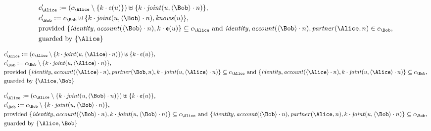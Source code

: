 \begin{align*}
&
c'_
{
\Alice
}
 := 
(c_
{
\Alice
}
 \setminus 
\{
k
\cdot
\text{\textcent}
(
u
)
\}
) \uplus 
\{
k
\cdot
\mathit{
joint
}
(
u
,
\langle
\Bob
\rangle
\cdot
n
)
\}
,\\
&
c'_
{
\Bob
}
 := 
c_
{
\Bob
}
 \uplus 
\{
k
\cdot
\mathit{
joint
}
(
u
,
\langle
\Bob
\rangle
\cdot
n
)
,
\mathit{
knows
}
(
u
)
\}
,\\
&
\text{provided } 
\{
\mathit{
identity
}
,
\mathit{
account
}
(
\langle
\Bob
\rangle
\cdot
n
)
,
k
\cdot
\text{\textcent}
(
u
)
\}
 \subseteq c_
{
\Alice
}
 \text{ and } 
\mathit{
identity
}
,
\mathit{
account
}
(
\langle
\Bob
\rangle
\cdot
n
)
,
\mathit{
partner
}
(
\Alice
,
n
)
 \in c_
{
\Bob
}
,\\
&
\text{guarded by } \{
\Alice
\}
\end{align*}

\begin{align*}
&
c'_
{
\Alice
}
 := 
(c_
{
\Alice
}
 \setminus 
\{
k
\cdot
\mathit{
joint
}
(
u
,
\langle
\Alice
\rangle
\cdot
n
)
\}
) \uplus 
\{
k
\cdot
\text{\textcent}
(
u
)
\}
,\\
&
c'_
{
\Bob
}
 := 
c_
{
\Bob
}
 \setminus 
\{
k
\cdot
\mathit{
joint
}
(
u
,
\langle
\Alice
\rangle
\cdot
n
)
\}
,\\
&
\text{provided } 
\{
\mathit{
identity
}
,
\mathit{
account
}
(
\langle
\Alice
\rangle
\cdot
n
)
,
\mathit{
partner
}
(
\Bob
,
n
)
,
k
\cdot
\mathit{
joint
}
(
u
,
\langle
\Alice
\rangle
\cdot
n
)
\}
 \subseteq c_
{
\Alice
}
 \text{ and } 
\{
\mathit{
identity
}
,
\mathit{
account
}
(
\langle
\Alice
\rangle
\cdot
n
)
,
k
\cdot
\mathit{
joint
}
(
u
,
\langle
\Alice
\rangle
\cdot
n
)
\}
 \subseteq c_
{
\Bob
}
,\\
&
\text{guarded by } \{
\Alice
,
\Bob
\}
\end{align*}

\begin{align*}
&
c'_
{
\Alice
}
 := 
(c_
{
\Alice
}
 \setminus 
\{
k
\cdot
\mathit{
joint
}
(
u
,
\langle
\Bob
\rangle
\cdot
n
)
\}
) \uplus 
\{
k
\cdot
\text{\textcent}
(
u
)
\}
,\\
&
c'_
{
\Bob
}
 := 
c_
{
\Bob
}
 \setminus 
\{
k
\cdot
\mathit{
joint
}
(
u
,
\langle
\Bob
\rangle
\cdot
n
)
\}
,\\
&
\text{provided } 
\{
\mathit{
identity
}
,
\mathit{
account
}
(
\langle
\Bob
\rangle
\cdot
n
)
,
k
\cdot
\mathit{
joint
}
(
u
,
\langle
\Bob
\rangle
\cdot
n
)
\}
 \subseteq c_
{
\Alice
}
 \text{ and } 
\{
\mathit{
identity
}
,
\mathit{
account
}
(
\langle
\Bob
\rangle
\cdot
n
)
,
\mathit{
partner
}
(
\Alice
,
n
)
,
k
\cdot
\mathit{
joint
}
(
u
,
\langle
\Bob
\rangle
\cdot
n
)
\}
 \subseteq c_
{
\Bob
}
,\\
&
\text{guarded by } \{
\Alice
,
\Bob
\}
\end{align*}
